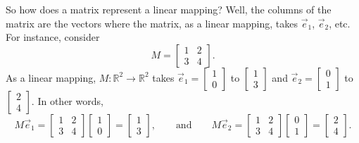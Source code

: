 So how does a matrix represent a linear mapping?
Well, the columns of the matrix are the vectors where the matrix,
as a linear
mapping, takes $\vec{e}_1$, $\vec{e}_2$, etc.
For instance, consider
\begin{equation*}
M =
\begin{bmatrix}
1 & 2 \\ 3 & 4
\end{bmatrix} .
\end{equation*}
As a linear mapping, $M \colon {\mathbb R}^2 \to {\mathbb R}^2$ takes
$\vec{e}_1 = \left[ \begin{smallmatrix} 1 \\ 0 \end{smallmatrix} \right]$ to
$\left[ \begin{smallmatrix} 1 \\ 3 \end{smallmatrix} \right]$
and
$\vec{e}_2 = \left[ \begin{smallmatrix} 0 \\ 1 \end{smallmatrix} \right]$ to
$\left[ \begin{smallmatrix} 2 \\ 4 \end{smallmatrix} \right]$.  In other
words,
\begin{equation*}
M \vec{e}_1 =
\begin{bmatrix}
1 & 2 \\ 3 & 4
\end{bmatrix}
\begin{bmatrix}
1 \\ 0
\end{bmatrix}
=
\begin{bmatrix}
1 \\ 3
\end{bmatrix},
\qquad
\text{and}
\qquad
M \vec{e}_2 =
\begin{bmatrix}
1 & 2 \\ 3 & 4
\end{bmatrix}
\begin{bmatrix}
0 \\ 1
\end{bmatrix}
=
\begin{bmatrix}
2 \\ 4
\end{bmatrix}.
\end{equation*}

